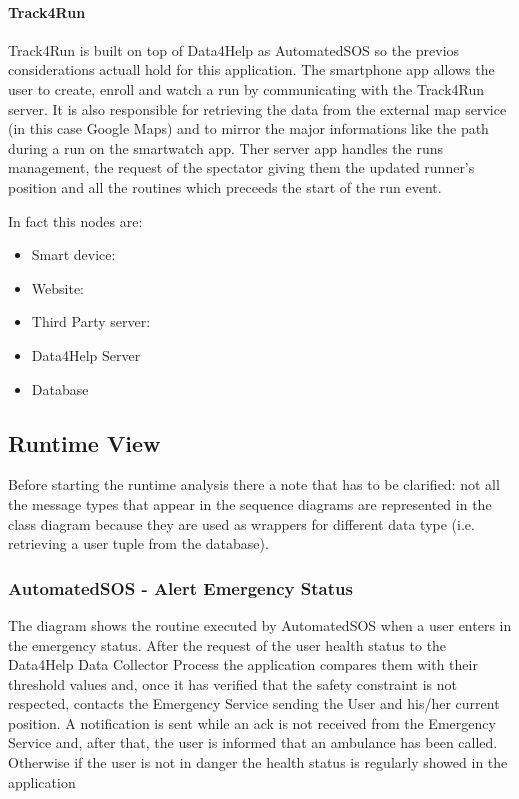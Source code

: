 \documentclass[a4paper]{article}
\begin{document}
\paragraph{Track4Run}
Track4Run is built on top of Data4Help as AutomatedSOS so the previos considerations actuall hold for this application. The smartphone app allows the user to create, enroll and watch a run by communicating with the Track4Run server. It is also responsible for retrieving the data from the external map service (in this case Google Maps) and to mirror the major informations like the path during a run on the smartwatch app. Ther server app handles the runs management, the request of the spectator giving them the updated runner's position and all the routines which preceeds the start of the run event.



In fact this nodes are:


\begin{itemize}
    \item Smart device: 
    \item Website:
    \item Third Party server:
    \item Data4Help Server
    \item Database
\end{itemize}

\clearpage

\subsection{Runtime View}
Before starting the runtime analysis there a note that has to be clarified: not all the message types that appear in the sequence diagrams are represented in the class diagram because they are used as wrappers for different data type (i.e. retrieving a user tuple from the database).

\subsubsection{AutomatedSOS - Alert Emergency Status}
The diagram shows the routine executed by AutomatedSOS when a user enters in the emergency status. After the request of the user health status to the Data4Help Data Collector Process the application compares them with their threshold values and, once it has verified that the safety constraint is not respected, contacts the Emergency Service sending the User and his/her current position. A notification is sent while an ack is not received from the Emergency Service and, after that, the user is informed that an ambulance has been called. Otherwise if the user is not in danger the health status is regularly showed in the application
\end{document}
